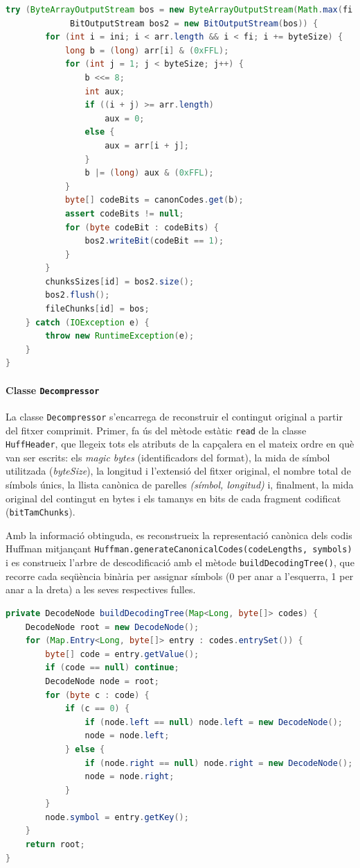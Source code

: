 \documentclass{ieeetj}
\begin{document}
\begin{lstlisting}[language = Java, breaklines = true]      
try (ByteArrayOutputStream bos = new ByteArrayOutputStream(Math.max(fi - ini, 0));
             BitOutputStream bos2 = new BitOutputStream(bos)) {
        for (int i = ini; i < arr.length && i < fi; i += byteSize) {
            long b = (long) arr[i] & (0xFFL);
            for (int j = 1; j < byteSize; j++) {
                b <<= 8;
                int aux;
                if ((i + j) >= arr.length)
                    aux = 0;
                else {
                    aux = arr[i + j];
                }
                b |= (long) aux & (0xFFL);
            }
            byte[] codeBits = canonCodes.get(b);
            assert codeBits != null;
            for (byte codeBit : codeBits) {
                bos2.writeBit(codeBit == 1);
            }
        }
        chunksSizes[id] = bos2.size();
        bos2.flush();
        fileChunks[id] = bos;
    } catch (IOException e) {
        throw new RuntimeException(e);
    }
}
\end{lstlisting}
\paragraph{Classe \texttt{Decompressor}}  
La classe \texttt{Decompressor} s'encarrega de reconstruir el contingut original a partir del fitxer comprimit. Primer, fa ús del mètode estàtic \texttt{read} de la classe \texttt{HuffHeader}, que llegeix tots els atributs de la capçalera en el mateix ordre en què van ser escrits: els \textit{magic bytes} (identificadors del format), la mida de símbol utilitzada (\textit{byteSize}), la longitud i l’extensió del fitxer original, el nombre total de símbols únics, la llista canònica de parelles \textit{(símbol, longitud)} i, finalment, la mida original del contingut en bytes i els tamanys en bits de cada fragment codificat (\texttt{bitTamChunks}).

Amb la informació obtinguda, es reconstrueix la representació canònica dels codis Huffman mitjançant \texttt{Huffman.generateCanonicalCodes(codeLengths, symbols)} i es construeix l’arbre de descodificació amb el mètode \texttt{buildDecodingTree()}, que recorre cada seqüència binària per assignar símbols (0 per anar a l’esquerra, 1 per anar a la dreta) a les seves respectives fulles.

\begin{lstlisting}[language= Java, breaklines = true]
 private DecodeNode buildDecodingTree(Map<Long, byte[]> codes) {
    DecodeNode root = new DecodeNode();
    for (Map.Entry<Long, byte[]> entry : codes.entrySet()) {
        byte[] code = entry.getValue();
        if (code == null) continue;
        DecodeNode node = root;
        for (byte c : code) {
            if (c == 0) {
                if (node.left == null) node.left = new DecodeNode();
                node = node.left;
            } else {
                if (node.right == null) node.right = new DecodeNode();
                node = node.right;
            }
        }
        node.symbol = entry.getKey();
    }
    return root;
}
\end{lstlisting}
\end{document}
